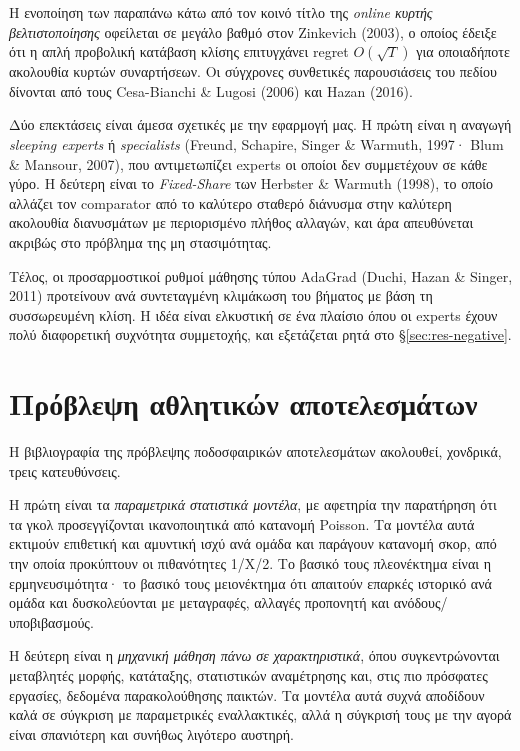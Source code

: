 \documentclass[12pt,a4paper,oneside]{report}
\renewcommand{\_}{\oldunderscore\allowbreak}
\theoremstyle{definition}
\theoremstyle{plain}
\theoremstyle{remark}
\begin{document}
Η ενοποίηση των παραπάνω κάτω από τον κοινό τίτλο της \emph{online κυρτής βελτιστοποίησης}
οφείλεται σε μεγάλο βαθμό στον Zinkevich (2003), ο οποίος έδειξε ότι η απλή προβολική
κατάβαση κλίσης επιτυγχάνει regret $O(\sqrt{T})$ για οποιαδήποτε ακολουθία κυρτών
συναρτήσεων. Οι σύγχρονες συνθετικές παρουσιάσεις του πεδίου δίνονται από τους Cesa-Bianchi
\& Lugosi (2006) και Hazan (2016).

Δύο επεκτάσεις είναι άμεσα σχετικές με την εφαρμογή μας. Η πρώτη είναι η αναγωγή
\emph{sleeping experts} ή \emph{specialists} (Freund, Schapire, Singer \& Warmuth, 1997·
Blum \& Mansour, 2007), που αντιμετωπίζει experts οι οποίοι δεν συμμετέχουν σε κάθε γύρο. Η
δεύτερη είναι το \emph{Fixed-Share} των Herbster \& Warmuth (1998), το οποίο αλλάζει τον
comparator από το καλύτερο σταθερό διάνυσμα στην καλύτερη ακολουθία διανυσμάτων με
περιορισμένο πλήθος αλλαγών, και άρα απευθύνεται ακριβώς στο πρόβλημα της μη στασιμότητας.

Τέλος, οι προσαρμοστικοί ρυθμοί μάθησης τύπου AdaGrad (Duchi, Hazan \& Singer, 2011)
προτείνουν ανά συντεταγμένη κλιμάκωση του βήματος με βάση τη συσσωρευμένη κλίση. Η ιδέα
είναι ελκυστική σε ένα πλαίσιο όπου οι experts έχουν πολύ διαφορετική συχνότητα συμμετοχής,
και εξετάζεται ρητά στο \S\ref{sec:res-negative}.

\section{Πρόβλεψη αθλητικών αποτελεσμάτων}

Η βιβλιογραφία της πρόβλεψης ποδοσφαιρικών αποτελεσμάτων ακολουθεί, χονδρικά, τρεις
κατευθύνσεις.

Η πρώτη είναι τα \emph{παραμετρικά στατιστικά μοντέλα}, με αφετηρία την παρατήρηση ότι τα
γκολ προσεγγίζονται ικανοποιητικά από κατανομή Poisson. Τα μοντέλα αυτά εκτιμούν επιθετική
και αμυντική ισχύ ανά ομάδα και παράγουν κατανομή σκορ, από την οποία προκύπτουν οι
πιθανότητες 1/Χ/2. Το βασικό τους πλεονέκτημα είναι η ερμηνευσιμότητα· το βασικό τους
μειονέκτημα ότι απαιτούν επαρκές ιστορικό ανά ομάδα και δυσκολεύονται με μεταγραφές,
αλλαγές προπονητή και ανόδους/υποβιβασμούς.

Η δεύτερη είναι η \emph{μηχανική μάθηση πάνω σε χαρακτηριστικά}, όπου συγκεντρώνονται
μεταβλητές μορφής, κατάταξης, στατιστικών αναμέτρησης και, στις πιο πρόσφατες εργασίες,
δεδομένα παρακολούθησης παικτών. Τα μοντέλα αυτά συχνά αποδίδουν καλά σε σύγκριση με
παραμετρικές εναλλακτικές, αλλά η σύγκρισή τους με την αγορά είναι σπανιότερη και συνήθως
λιγότερο αυστηρή.
\end{document}
